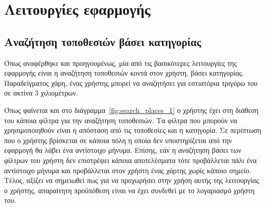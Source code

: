 \documentclass[oneside, 12pt]{book}
\begin{document}
\section{Λειτουργίες εφαρμογής}
\subsection{Αναζήτηση τοποθεσιών βάσει κατηγορίας}
Όπως αναφέρθηκε και προηγουμένως, μία από τις βασικότερες λειτουργίες 
της εφαρμογής είναι η αναζήτηση τοποθεσιών κοντά στον χρήστη, βάσει 
κατηγορίας. Παραδείγματος χάρη, ένας χρήστης μπορεί να αναζητήσει για 
εστιατόρια τριγύρω του σε ακτίνα 3 χιλιομέτρων.

Όπως φαίνεται και στο διάγραμμα~\ref{fig:search_places_1} ο χρήστης 
έχει στη διάθεση του κάποια φίλτρα για την αναζήτηση τοποθεσιών. Τα 
φίλτρα που μπορούν να χρησιμοποιηθούν είναι η απόσταση από τις 
τοποθεσίες και η κατηγορία. Σε περίπτωση που ο χρήστης βρίσκεται σε 
κάποια πόλη η οποία δεν υποστηρίζεται από την εφαρμογή θα λάβει ένα 
αντίστοιχο μήνυμα. Επίσης, εάν η αναζήτηση βάσει των φίλτρων του 
χρήστη δεν επιστρέψει κάποια αποτελέσματα τότε προβάλλεται πάλι ένα 
αντίστοιχο μήνυμα και προβάλλεται στον χρήστη ένας χάρτης χωρίς κάποιο
σημείο. Τέλος, αξίζει να σημειωθεί πως για να προχωρήσει στην χρήση 
αυτής της λειτουργίας ο χρήστης, απαραίτητη προϋπόθεση είναι να έχει 
συνδεθεί με το λογαριασμό χρήστη του. 
\end{document}
